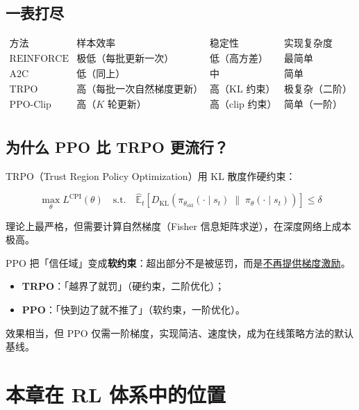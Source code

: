 \documentclass{article}
\begin{document}
\subsection*{一表打尽}

\[
\begin{array}{c|c|c|c}
\text{方法} & \text{样本效率} & \text{稳定性} & \text{实现复杂度} \\
\hline
\text{REINFORCE}  & \text{极低（每批更新一次）} & \text{低（高方差）}  & \text{最简单} \\
\text{A2C}        & \text{低（同上）}           & \text{中}            & \text{简单} \\
\text{TRPO}       & \text{高（每批一次自然梯度更新）} & \text{高（KL 约束）} & \text{极复杂（二阶）} \\
\text{PPO-Clip}   & \text{高（$K$ 轮更新）}     & \text{高（clip 约束）} & \text{简单（一阶）} \\
\end{array}
\]

\subsection*{为什么 PPO 比 TRPO 更流行？}

TRPO（Trust Region Policy Optimization）用 KL 散度作硬约束：

\[
\max_\theta L^{\text{CPI}}(\theta)
\quad \text{s.t.} \quad
\hat{\mathbb{E}}_t\!\left[D_{\text{KL}}\!\left(\pi_{\theta_\text{old}}(\cdot\mid s_t)
  \;\|\; \pi_\theta(\cdot\mid s_t)\right)\right] \le \delta
\]

理论上最严格，但需要计算自然梯度（Fisher 信息矩阵求逆），在深度网络上成本极高。

PPO 把「信任域」变成\textbf{软约束}：超出部分不是被惩罚，而是\underline{不再提供梯度激励}。

\begin{itemize}
  \item \textbf{TRPO}：「越界了就罚」（硬约束，二阶优化）；
  \item \textbf{PPO}：「快到边了就不推了」（软约束，一阶优化）。
\end{itemize}

效果相当，但 PPO 仅需一阶梯度，实现简洁、速度快，成为在线策略方法的默认基线。

\section*{本章在 RL 体系中的位置}
\end{document}
